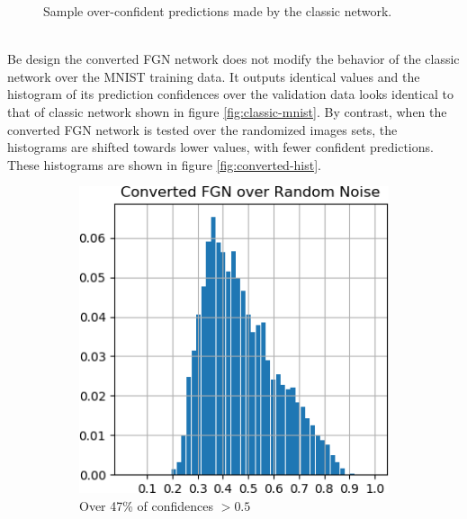 \documentclass[12pt,oneside]{CUNY_PhD}
\begin{document}
\begin{figure}[!htbp]
\begin{subfigure}[t]{0.49\textwidth}
    \end{subfigure}
    \caption{Sample over-confident predictions made by the classic network.}
    \label{fig:classic-preds}
\end{figure}\\
\indent Be design the converted FGN network does not modify the behavior of the classic network over the MNIST training data. It outputs identical values and the histogram of its prediction confidences over the validation data looks identical to that of classic network shown in figure \ref{fig:classic-mnist}. By contrast, when the converted FGN network is tested over the randomized images sets, the histograms are shifted towards lower values, with fewer confident predictions. These histograms are shown in figure \ref{fig:converted-hist}.
\begin{figure}[!htbp]
    \centering
    \begin{subfigure}[t]{0.49\textwidth}
        \includegraphics[width=\textwidth]{images/mnist-behavior/converted-hist-random.png}
        \caption*{Over 47\% of confidences $>0.5$}
    \end{subfigure}
    \begin{subfigure}[t]{0.49\textwidth}

\end{subfigure}
\end{figure}
\end{document}
